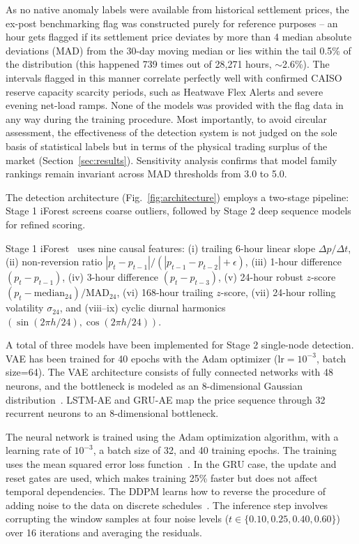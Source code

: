\documentclass[journal]{IEEEtran}
\begin{document}
As no native anomaly labels were available from historical settlement prices, the ex-post benchmarking flag was constructed purely for reference purposes – an hour gets flagged if its settlement price deviates by more than 4 median absolute deviations (MAD) from the 30-day moving median or lies within the tail 0.5\% of the distribution (this happened 739 times out of 28,271 hours, $\sim$2.6\%). The intervals flagged in this manner correlate perfectly well with confirmed CAISO reserve capacity scarcity periods, such as Heatwave Flex Alerts and severe evening net-load ramps. None of the models was provided with the flag data in any way during the training procedure. Most importantly, to avoid circular assessment, the effectiveness of the detection system is not judged on the sole basis of statistical labels but in terms of the physical trading surplus of the market (Section~\ref{sec:results}). Sensitivity analysis confirms that model family rankings remain invariant across MAD thresholds from 3.0 to 5.0.

The detection architecture (Fig.~\ref{fig:architecture}) employs a two-stage pipeline: Stage 1 iForest screens coarse outliers, followed by Stage 2 deep sequence models for refined scoring.

Stage 1 iForest~\cite{IForest} uses nine causal features: (i) trailing 6-hour linear slope $\Delta p / \Delta t$, (ii) non-reversion ratio $|p_t - p_{t-1}| / (|p_{t-1} - p_{t-2}| + \epsilon)$, (iii) 1-hour difference $(p_t - p_{t-1})$, (iv) 3-hour difference $(p_t - p_{t-3})$, (v) 24-hour robust $z$-score $(p_t - \text{median}_{24}) / \text{MAD}_{24}$, (vi) 168-hour trailing $z$-score, (vii) 24-hour rolling volatility $\sigma_{24}$, and (viii--ix) cyclic diurnal harmonics $(\sin(2\pi h / 24), \cos(2\pi h / 24))$.

A total of three models have been implemented for Stage 2 single-node detection. VAE has been trained for 40 epochs with the Adam optimizer ($\text{lr}=10^{-3}$, batch size=64). The VAE architecture consists of fully connected networks with 48 neurons, and the bottleneck is modeled as an 8-dimensional Gaussian distribution~\cite{VAE}. LSTM-AE and GRU-AE map the price sequence through 32 recurrent neurons to an 8-dimensional bottleneck.

The neural network is trained using the Adam optimization algorithm, with a learning rate of $10^{-3}$, a batch size of 32, and 40 training epochs. The training uses the mean squared error loss function~\cite{Audibert_USAD}. In the GRU case, the update and reset gates are used, which makes training 25\% faster but does not affect temporal dependencies. The DDPM learns how to reverse the procedure of adding noise to the data on discrete schedules~\cite{DDPM}. The inference step involves corrupting the window samples at four noise levels ($t \in \{0.10, 0.25, 0.40, 0.60\}$) over 16 iterations and averaging the residuals.
\end{document}
